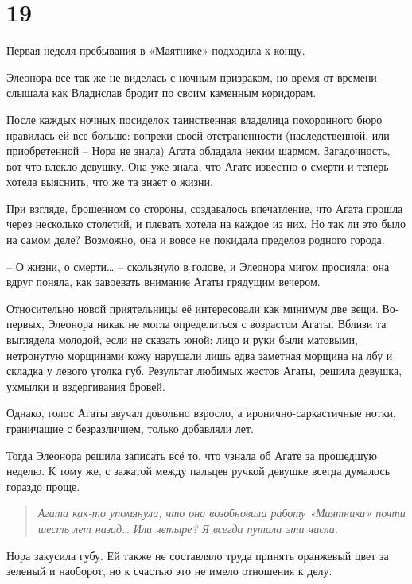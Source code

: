 \documentclass[
  a5paperpaper,
  DIV=11,
  numbers=noendperiod]{scrreprt}
\begin{document}
\section*{19}\label{19}


Первая неделя пребывания в «Маятнике» подходила к концу.

Элеонора все так же не виделась с ночным призраком, но время от времени
слышала как Владислав бродит по своим каменным коридорам.

После каждых ночных посиделок таинственная владелица похоронного бюро
нравилась ей все больше: вопреки своей отстраненности (наследственной,
или приобретенной -- Нора не знала) Агата обладала неким шармом.
Загадочность, вот что влекло девушку. Она уже знала, что Агате известно
о смерти и теперь хотела выяснить, что же та знает о жизни.

При взгляде, брошенном со стороны, создавалось впечатление, что Агата
прошла через несколько столетий, и плевать хотела на каждое из них. Но
так ли это было на самом деле? Возможно, она и вовсе не покидала
пределов родного города.

-- О жизни, о смерти\ldots{} -- скользнуло в голове, и Элеонора мигом
просияла: она вдруг поняла, как завоевать внимание Агаты грядущим
вечером.

Относительно новой приятельницы её интересовали как минимум две вещи.
Во-первых, Элеонора никак не могла определиться с возрастом Агаты.
Вблизи та выглядела молодой, если не сказать юной: лицо и руки были
матовыми, нетронутую морщинами кожу нарушали лишь едва заметная морщина
на лбу и складка у левого уголка губ. Результат любимых жестов Агаты,
решила девушка, ухмылки и вздергивания бровей.

Однако, голос Агаты звучал довольно взросло, а иронично-саркастичные
нотки, граничащие с безразличием, только добавляли лет.

Тогда Элеонора решила записать всё то, что узнала об Агате за прошедшую
неделю. К тому же, с зажатой между пальцев ручкой девушке всегда
думалось гораздо проще.

\begin{quote}
\emph{Агата как-то упомянула, что она возобновила работу «Маятника»
почти шесть лет назад\ldots{} Или четыре? Я всегда путала эти числа.}
\end{quote}

Нора закусила губу. Ей также не составляло труда принять оранжевый цвет
за зеленый и наоборот, но к счастью это не имело отношения к делу.
\end{document}
